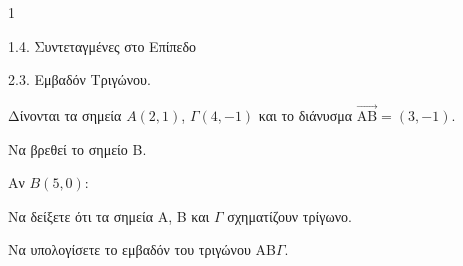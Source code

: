 \begin{ylh}{1}
    \item 1.4. Συντεταγμένες στο Επίπεδο
    \item 2.3. Εμβαδόν Τριγώνου.
\end{ylh}
Δίνονται τα σημεία $A(2,1)$, $\Gamma(4,-1)$ και το διάνυσμα $\vec{\text{AB}} = (3,-1)$.
\begin{alist}
\item Να βρεθεί το σημείο B. 
\item Αν $B(5,0)$:
    \begin{rlist}
    \item Να δείξετε ότι τα σημεία A, B και $\Gamma$ σχηματίζουν τρίγωνο. 
    \item Να υπολογίσετε το εμβαδόν του τριγώνου AB$\Gamma$. 
    \end{rlist}
\end{alist}